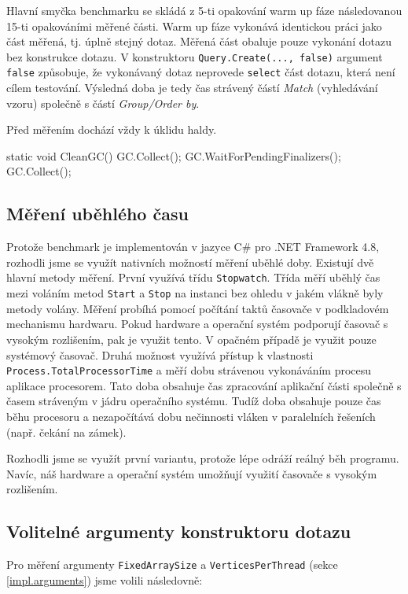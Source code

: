 Hlavní smyčka benchmarku se skládá z 5-ti opakování warm up fáze následovanou 15-ti opakováními měřené části.
Warm up fáze vykonává identickou práci jako část měřená, tj. úplně stejný dotaz. 
Měřená část obaluje pouze vykonání dotazu bez konstrukce dotazu. 
V konstruktoru \verb+Query.Create(..., false)+ argument \verb+false+ způsobuje, že vykonávaný dotaz neprovede \verb+select+ část dotazu, která není cílem testování.
Výsledná doba je tedy čas strávený částí \textit{Match} (vyhledávání vzoru) společně s částí \textit{Group/Order by}. 

Před měřením dochází vždy k úklidu haldy. 
\begin{code}
static void CleanGC()
{
    GC.Collect();
    GC.WaitForPendingFinalizers();
    GC.Collect();
}
\end{code}

\subsection{Měření uběhlého času}

Protože benchmark je implementován v jazyce C\# pro .NET Framework 4.8, rozhodli jsme se využít nativních možností měření uběhlé doby.
Existují dvě hlavní metody měření.
První využívá třídu \texttt{Stopwatch}.
Třída měří uběhlý čas mezi voláním metod \texttt{Start} a \texttt{Stop} na instanci bez ohledu v jakém vlákně byly metody volány.
Měření probíhá pomocí počítání taktů časovače v podkladovém mechanismu hardwaru.
Pokud hardware a operační systém podporují časovač s vysokým rozlišením, pak je využit tento.
V opačném případě je využit pouze systémový časovač. 
Druhá možnost využívá přístup k vlastnosti \texttt{Process.TotalProcessorTime} a měří dobu strávenou vykonáváním procesu aplikace procesorem.
Tato doba obsahuje čas zpracování aplikační části společně s časem stráveným v jádru operačního systému.
Tudíž doba obsahuje pouze čas běhu procesoru a nezapočítává dobu nečinnosti vláken v paralelních řešeních (např. čekání na zámek).

Rozhodli jsme se využít první variantu, protože lépe odráží reálný běh programu.
Navíc, náš hardware a operační systém umožňují využití časovače s vysokým rozlišením.

\subsection{Volitelné argumenty konstruktoru dotazu}

Pro měření argumenty \verb+FixedArraySize+ a \verb+VerticesPerThread+ (sekce \ref{impl.arguments}) jsme volili následovně:

